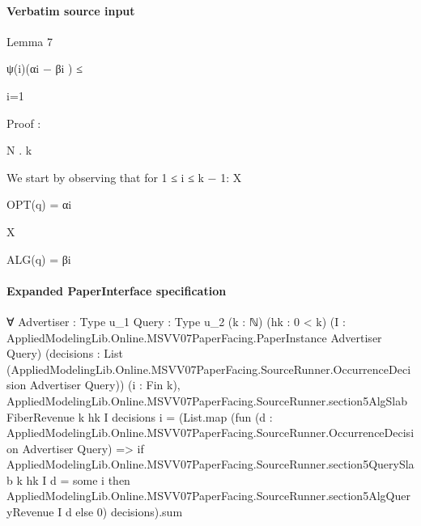 \documentclass[10pt]{article}
\begin{document}
\paragraph{Verbatim source input}
\begin{ReviewVerbatim}
Lemma 7

ψ(i)(αi − βi ) ≤

i=1

Proof :

N
.
k

We start by observing that for 1 ≤ i ≤ k − 1:
X

OPT(q) = αi

X

ALG(q) = βi
\end{ReviewVerbatim}



\paragraph{Expanded PaperInterface specification}
\begin{ReviewVerbatim}
∀ {Advertiser : Type u_1} {Query : Type u_2} (k : ℕ) (hk : 0 < k)
  (I : AppliedModelingLib.Online.MSVV07PaperFacing.PaperInstance Advertiser Query)
  (decisions : List (AppliedModelingLib.Online.MSVV07PaperFacing.SourceRunner.OccurrenceDecision Advertiser Query))
  (i : Fin k),
  AppliedModelingLib.Online.MSVV07PaperFacing.SourceRunner.section5AlgSlabFiberRevenue k hk I decisions i =
    (List.map
        (fun (d : AppliedModelingLib.Online.MSVV07PaperFacing.SourceRunner.OccurrenceDecision Advertiser Query) =>
          if AppliedModelingLib.Online.MSVV07PaperFacing.SourceRunner.section5QuerySlab k hk I d = some i then
            AppliedModelingLib.Online.MSVV07PaperFacing.SourceRunner.section5AlgQueryRevenue I d
          else 0)
        decisions).sum
\end{ReviewVerbatim}
\end{document}
